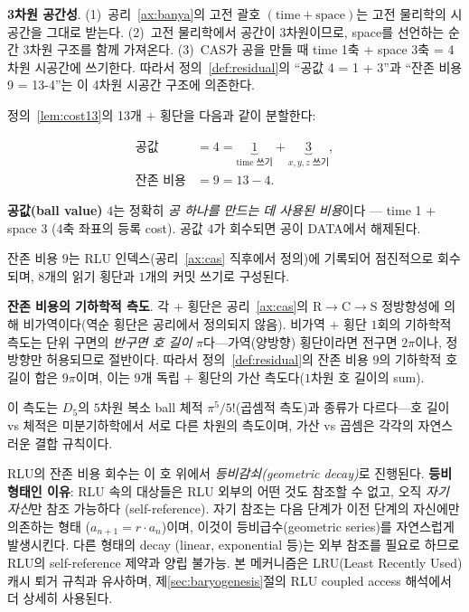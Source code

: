 \documentclass[entropy,article,submit,pdftex,oneauthor]{Definitions/mdpi}
\begin{document}
\textbf{3차원 공간성}. (1)~공리~\ref{ax:banya}의 고전 괄호 $(\mathrm{time} + \mathrm{space})$는 고전 물리학의 시공간을 그대로 받는다. (2)~고전 물리학에서 공간이 3차원이므로, space를 선언하는 순간 3차원 구조를 함께 가져온다. (3)~CAS가 공을 만들 때 time 1축 + space 3축 = 4차원 시공간에 쓰기한다. 따라서 정의~\ref{def:residual}의 ``공값 4 = 1 + 3''과 ``잔존 비용 9 = 13-4''는 이 4차원 시공간 구조에 의존한다.

\begin{Definition}[공값과 잔존 비용]\label{def:residual}
정의~\ref{lem:cost13}의 13개 $+$ 횡단을 다음과 같이 분할한다:
\begin{linenomath}
\begin{align}
\text{공값} &= 4 = \underbrace{1}_{\text{time 쓰기}} + \underbrace{3}_{x,y,z\text{ 쓰기}}, \\
\text{잔존 비용} &= 9 = 13 - 4.
\end{align}
\end{linenomath}
\textbf{공값(ball value)} $4$는 정확히 \emph{공 하나를 만드는 데 사용된 비용}이다 — time 1 + space 3 (4축 좌표의 등록 cost). 공값 $4$가 회수되면 공이 DATA에서 해제된다.

잔존 비용 $9$는 RLU 인덱스(공리~\ref{ax:cas} 직후에서 정의)에 기록되어 점진적으로 회수되며, $8$개의 읽기 횡단과 $1$개의 커밋 쓰기로 구성된다.
\end{Definition}

\textbf{잔존 비용의 기하학적 측도}\label{rem:geometric-measure}. 각 $+$ 횡단은 공리~\ref{ax:cas}의 $\mathrm{R} \to \mathrm{C} \to \mathrm{S}$ 정방향성에 의해 비가역이다(역순 횡단은 공리에서 정의되지 않음). 비가역 $+$ 횡단 $1$회의 기하학적 측도는 단위 구면의 \emph{반구면 호 길이} $\pi$다---가역(양방향) 횡단이라면 전구면 $2\pi$이나, 정방향만 허용되므로 절반이다. 따라서 정의~\ref{def:residual}의 잔존 비용 $9$의 기하학적 호 길이 합은 $9\pi$이며, 이는 $9$개 독립 $+$ 횡단의 가산 측도다($1$차원 호 길이의 sum).

이 측도는 $D_5$의 $5$차원 복소 ball 체적 $\pi^5/5!$(곱셈적 측도)과 종류가 다르다---호 길이 vs 체적은 미분기하학에서 서로 다른 차원의 측도이며, 가산 vs 곱셈은 각각의 자연스러운 결합 규칙이다.

RLU의 잔존 비용 회수는 이 호 위에서 \emph{등비감쇠(geometric decay)}로 진행된다. \textbf{등비 형태인 이유}: RLU 속의 대상들은 RLU 외부의 어떤 것도 참조할 수 없고, 오직 \emph{자기 자신}만 참조 가능하다 (self-reference). 자기 참조는 다음 단계가 이전 단계의 자신에만 의존하는 형태 ($a_{n+1} = r \cdot a_n$)이며, 이것이 등비급수(geometric series)를 자연스럽게 발생시킨다. 다른 형태의 decay (linear, exponential 등)는 외부 참조를 필요로 하므로 RLU의 self-reference 제약과 양립 불가능. 본 메커니즘은 LRU(Least Recently Used) 캐시 퇴거 규칙과 유사하며, 제\ref{sec:baryogenesis}절의 RLU coupled access 해석에서 더 상세히 사용된다.
\end{document}
